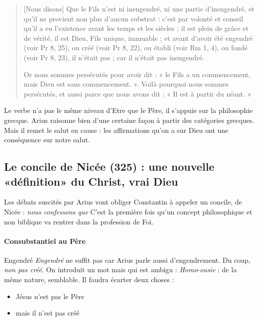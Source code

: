 \begin{quote}
    {[}Nous disons{]} Que le Fils n'est ni inengendré, ni une partie
d'inengendré, et qu'il ne provient non plus d'aucun substrat : c'est par
volonté et conseil qu'il a eu l'existence avant les temps et les siècles
; il est plein de grâce et de vérité, il est Dieu, Fils unique, immuable
; et avant d'avoir été engendré (voir Pr 8, 25), ou créé (voir Pr 8,
22), ou établi (voir Rm 1, 4), ou fondé (voir Pr 8, 23), il n'était pas
; car il n'était pas inengendré.

Or nous sommes persécutés pour avoir dit : « le Fils a un commencement,
mais Dieu est sans commencement. ». Voilà pourquoi nous sommes
persécutés, et aussi parce que nous avons dit : « Il est à partir du
néant. » 
\end{quote}

Le verbe n'a pas le même niveau d'Etre que le Père, il s'appuie sur la philosophie grecque.
Arius raisonne bien d'une certaine façon à partir des catégories grecques. Mais il remet le salut en cause : les affirmations qu'on a sur Dieu ont une conséquence sur notre salut. 






    \subsection{Le concile de Nicée (325) : une nouvelle «définition» du
    Christ, vrai Dieu}

Les débats suscités par Arius vont obliger Constantin à appeler un concile, de Nicée : \textit{nous confessons que}
C'est la première fois qu'un concept philosophique et non biblique va rentrer dans la profession de Foi. 
    
    
    
      \paragraph{Consubstantiel au Père}
      Engendré
       \textit{Engendré} ne suffit pas car Arius parle aussi d'engendrement. Du coup, \textit{non pas créé}. 
       On introduit un mot mais qui est ambigu : 
       \emph{Homo}-\emph{ousie} : de la même nature, semblable. Il faudra écarter deux choses : 
       \begin{itemize}
           \item Jésus n'est pas le Père
           \item mais il n'est pas créé
       \end{itemize}
       
